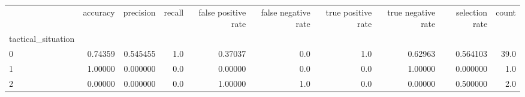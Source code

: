\begin{tabular}{lrrrrrrrrr}
\toprule
{} &  accuracy &  precision &  recall &  false positive rate &  false negative rate &  true positive rate &  true negative rate &  selection rate &  count \\
tactical\_situation &           &            &         &                      &                      &                     &                     &                 &        \\
\midrule
0                  &   0.74359 &   0.545455 &     1.0 &              0.37037 &                  0.0 &                 1.0 &             0.62963 &        0.564103 &   39.0 \\
1                  &   1.00000 &   0.000000 &     0.0 &              0.00000 &                  0.0 &                 0.0 &             1.00000 &        0.000000 &    1.0 \\
2                  &   0.00000 &   0.000000 &     0.0 &              1.00000 &                  1.0 &                 0.0 &             0.00000 &        0.500000 &    2.0 \\
\bottomrule
\end{tabular}
